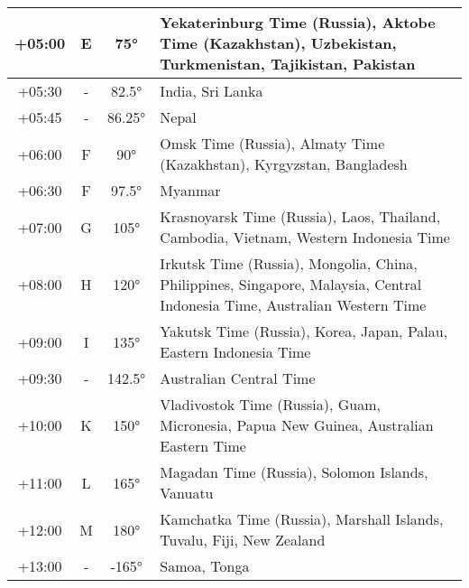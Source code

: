 \begin{footnotesize}
\begin{tabular}{c | c | c | p{}}
	+05:00&E&75°&Yekaterinburg Time (Russia), Aktobe Time (Kazakhstan), Uzbekistan, Turkmenistan, Tajikistan, Pakistan\\\hline
	+05:30& - &82.5°&India, Sri Lanka\\\hline
	+05:45& - &86.25°&Nepal\\\hline
	+06:00&F&90°&Omsk Time (Russia), Almaty Time (Kazakhstan), Kyrgyzstan, Bangladesh\\\hline
	+06:30&F&97.5°&Myanmar\\\hline
	+07:00&G&105°&Krasnoyarsk Time (Russia), Laos, Thailand, Cambodia, Vietnam, Western Indonesia Time\\\hline
	+08:00&H&120°&Irkutsk Time (Russia), Mongolia, China, Philippines, Singapore, Malaysia, Central Indonesia Time, Australian Western Time\\\hline
	+09:00&I&135°&Yakutsk Time (Russia), Korea, Japan, Palau, Eastern Indonesia Time\\\hline
	+09:30& - &142.5°&Australian Central Time\\\hline
	+10:00&K&150°&Vladivostok Time (Russia), Guam, Micronesia, Papua New Guinea, Australian Eastern Time\\\hline
	+11:00&L&165°&Magadan Time (Russia), Solomon Islands, Vanuatu\\\hline
	+12:00&M&180°&Kamchatka Time (Russia), Marshall Islands, Tuvalu, Fiji, New Zealand\\\hline
	+13:00& - &-165°&Samoa, Tonga\\\hline
\end{tabular}\end{footnotesize}